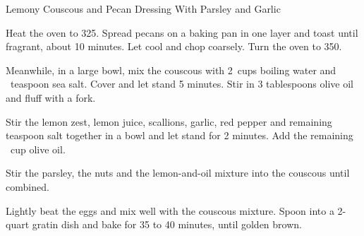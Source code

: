 \begin{recipe}{Lemony Couscous and Pecan Dressing With Parsley and Garlic}

    \begin{ingredients}
    \end{ingredients}

    \begin{instructions}
        Heat the oven to 325\degF.
        Spread pecans on a baking pan in one layer and toast until fragrant, about 10 minutes.
        Let cool and chop coarsely.
        Turn the oven to 350\degF.

        Meanwhile, in a large bowl, mix the couscous with 2\half~cups boiling water and \quarter~teaspoon sea salt.
        Cover and let stand 5 minutes.
        Stir in 3 tablespoons olive oil and fluff with a fork.

        Stir the lemon zest, lemon juice, scallions, garlic, red pepper and remaining teaspoon salt together in a bowl and let stand for 2 minutes.
        Add the remaining \half~cup olive oil.

        Stir the parsley, the nuts and the lemon-and-oil mixture into the couscous until combined.

        Lightly beat the eggs and mix well with the couscous mixture.
        Spoon into a 2-quart gratin dish and bake for 35 to 40 minutes, until golden brown. 
    \end{instructions}
\end{recipe}
